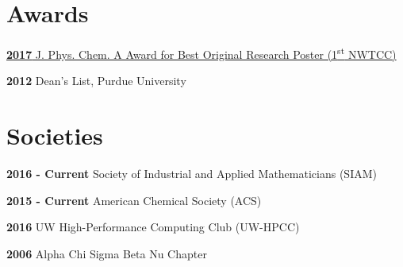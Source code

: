 \documentclass[letterpaper]{deedy-resume} %
\begin{document}
\begin{minipage}[t]{0.65\textwidth}
\section{Awards} 
\sectionspace
\begin{tightitemize}
\item \href{https://www.newswise.com/doescience/?article_id=684936&returnurl=aHR0cHM6Ly93d3cubmV3c3dpc2UuY29tL2FydGljbGVzL2xpc3Q=}{\textbf{2017} J. Phys. Chem. A Award for Best Original Research Poster (1\textsuperscript{st} NWTCC) }
\item \textbf{2012} Dean's List, Purdue University
\end{tightitemize}

\section{Societies} 
\sectionspace
\begin{tightitemize}
\item \textbf{2016 - Current} Society of Industrial and Applied Mathematicians (SIAM)
\item \textbf{2015 - Current} American Chemical Society (ACS)
\item \textbf{2016} UW High-Performance Computing Club (UW-HPCC)
\item \textbf{2006} Alpha Chi Sigma Beta Nu Chapter
\end{tightitemize}
\end{minipage} %
\end{document}
